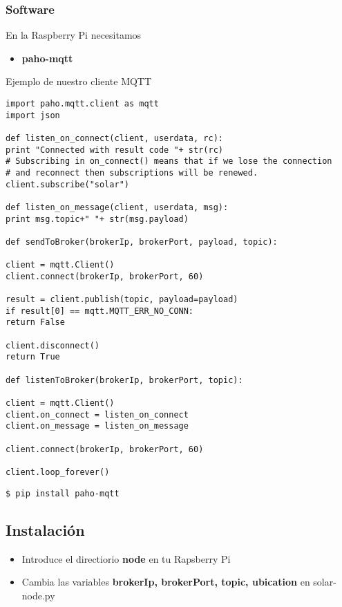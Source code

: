 \subsubsection{Software}
	En la Raspberry Pi necesitamos
	\begin{itemize}
		\item \textbf{paho-mqtt}
	\end{itemize}
	Ejemplo de nuestro cliente MQTT
\lstset{language=python}
\begin{lstlisting}[frame=single]
import paho.mqtt.client as mqtt
import json

def listen_on_connect(client, userdata, rc):
print "Connected with result code "+ str(rc)
# Subscribing in on_connect() means that if we lose the connection
# and reconnect then subscriptions will be renewed.
client.subscribe("solar")

def listen_on_message(client, userdata, msg):
print msg.topic+" "+ str(msg.payload)

def sendToBroker(brokerIp, brokerPort, payload, topic):

client = mqtt.Client()
client.connect(brokerIp, brokerPort, 60)

result = client.publish(topic, payload=payload)
if result[0] == mqtt.MQTT_ERR_NO_CONN:
return False

client.disconnect()
return True

def listenToBroker(brokerIp, brokerPort, topic):

client = mqtt.Client()
client.on_connect = listen_on_connect
client.on_message = listen_on_message

client.connect(brokerIp, brokerPort, 60)

client.loop_forever()
\end{lstlisting}

\lstset{language=bash}
\begin{lstlisting}[frame=single]
$ pip install paho-mqtt
\end{lstlisting}

\subsection{Instalación}
\label{makereference5.1.4}
	\begin{itemize}
		\item Introduce el directiorio \textbf{node} en tu Rapsberry Pi
		\item Cambia las variables \textbf{brokerIp, brokerPort, topic, ubication} en solar-node.py
	\end{itemize}


